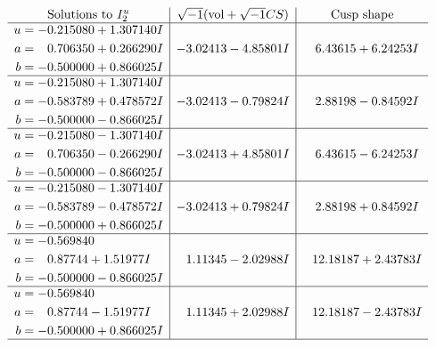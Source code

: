 \documentclass[1p]{elsarticle_modified}
\theoremstyle{definition}
\newcommand{\I}{\sqrt{-1}}
\begin{document}
$$\begin{array}{c|c|c}  
\text{Solutions to }I^u_{2}& \I (\text{vol} + \sqrt{-1}CS) & \text{Cusp shape}\\
 \hline 
\begin{aligned}
u &= -0.215080 + 1.307140 I \\
a &= \phantom{-}0.706350 + 0.266290 I \\
b &= -0.500000 + 0.866025 I\end{aligned}
 & -3.02413 - 4.85801 I & \phantom{-}6.43615 + 6.24253 I \\ \hline\begin{aligned}
u &= -0.215080 + 1.307140 I \\
a &= -0.583789 + 0.478572 I \\
b &= -0.500000 - 0.866025 I\end{aligned}
 & -3.02413 - 0.79824 I & \phantom{-}2.88198 - 0.84592 I \\ \hline\begin{aligned}
u &= -0.215080 - 1.307140 I \\
a &= \phantom{-}0.706350 - 0.266290 I \\
b &= -0.500000 - 0.866025 I\end{aligned}
 & -3.02413 + 4.85801 I & \phantom{-}6.43615 - 6.24253 I \\ \hline\begin{aligned}
u &= -0.215080 - 1.307140 I \\
a &= -0.583789 - 0.478572 I \\
b &= -0.500000 + 0.866025 I\end{aligned}
 & -3.02413 + 0.79824 I & \phantom{-}2.88198 + 0.84592 I \\ \hline\begin{aligned}
u &= -0.569840\phantom{ +0.000000I} \\
a &= \phantom{-}0.87744 + 1.51977 I \\
b &= -0.500000 - 0.866025 I\end{aligned}
 & \phantom{-}1.11345 - 2.02988 I & \phantom{-}12.18187 + 2.43783 I \\ \hline\begin{aligned}
u &= -0.569840\phantom{ +0.000000I} \\
a &= \phantom{-}0.87744 - 1.51977 I \\
b &= -0.500000 + 0.866025 I\end{aligned}
 & \phantom{-}1.11345 + 2.02988 I & \phantom{-}12.18187 - 2.43783 I\\
 \hline 
 \end{array}$$\newpage
\end{document}
